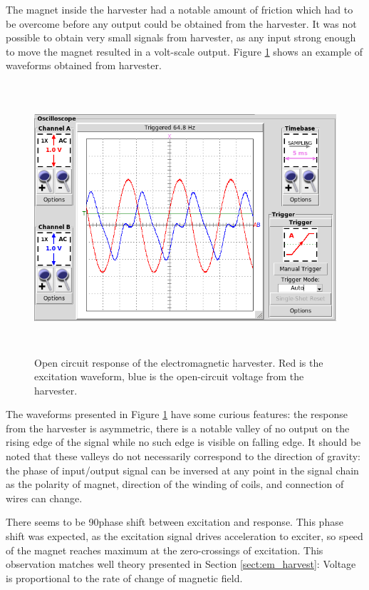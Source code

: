 The magnet inside the harvester had a notable amount of friction which had to be overcome before any output could be obtained from the harvester. It was not possible to obtain very small signals from harvester, as any input strong enough to move the magnet resulted in a volt-scale output. Figure \ref{fig:inductive_65_open_dry} shows an example of waveforms obtained from harvester. 

\begin{figure}[htb]
\begin{center}
\includegraphics[height=10cm]{images/own_measurement/generator_shaker/inductive_td_open_65hz_dry.png}
\end{center}
\caption{\label{fig:inductive_65_open_dry} Open circuit response of the electromagnetic harvester. Red is the excitation waveform, blue is the open-circuit voltage from the harvester.}
\end{figure}

The waveforms presented in Figure \ref{fig:inductive_65_open_dry} have some curious features: the response from the harvester is asymmetric, there is a notable valley of no output on the rising edge of the signal while no such edge is visible on falling edge. It should be noted that these valleys do not necessarily correspond to the direction of gravity: the phase of input/output signal can be inversed at any point in the signal chain as the polarity of magnet, direction of the winding of coils, and connection of wires can change.

There seems to be 90\degree  phase shift between excitation and response. This phase shift was expected, as the excitation signal drives acceleration to exciter, so speed of the magnet reaches maximum at the zero-crossings of excitation. This observation matches well theory presented in Section \ref{sect:em_harvest}: Voltage is proportional to the rate of change of magnetic field. 

